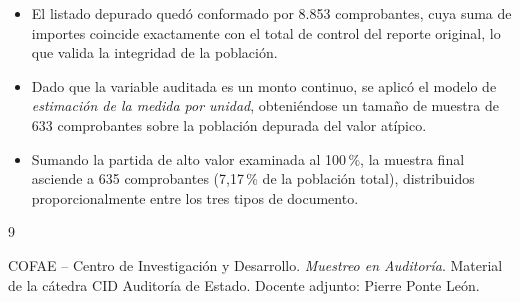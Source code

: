 \documentclass[12pt, a4paper]{article}
\theoremstyle{plain}
\theoremstyle{definition}
\theoremstyle{remark}
\begin{document}

\begin{itemize}
    \item El listado depurado quedó conformado por 8.853 comprobantes, cuya
    suma de importes coincide exactamente con el total de control del
    reporte original, lo que valida la integridad de la población.

    \item Dado que la variable auditada es un monto continuo, se aplicó el
    modelo de \emph{estimación de la medida por unidad}, obteniéndose un
    tamaño de muestra de 633 comprobantes sobre la población depurada del
    valor atípico.

    \item Sumando la partida de alto valor examinada al 100\,\%, la muestra
    final asciende a 635 comprobantes (7{,}17\,\% de la población total),
    distribuidos proporcionalmente entre los tres tipos de documento.
\end{itemize}


\newpage

\begin{thebibliography}{9}

COFAE -- Centro de Investigación y Desarrollo.
\emph{Muestreo en Auditoría}. Material de la cátedra CID Auditoría de
Estado. Docente adjunto: Pierre Ponte León.

\end{thebibliography}

\end{document}
